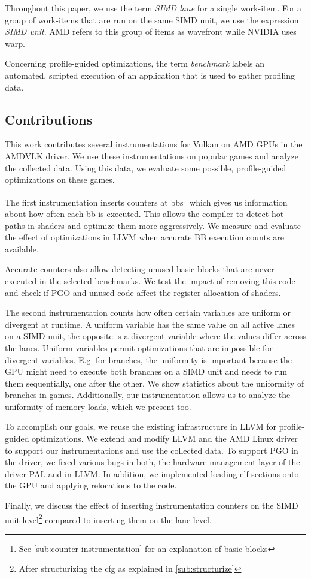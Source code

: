 Throughout this paper, we use the term \emph{SIMD lane} for a single work-item.
For a group of work-items that are run on the same SIMD unit, we use the expression \emph{SIMD unit}.
AMD refers to this group of items as wavefront while NVIDIA uses warp.

Concerning profile-guided optimizations, the term \emph{benchmark} labels an automated, scripted execution of an application that is used to gather profiling data.


\subsection{Contributions}
\label{sub:contributions}
This work contributes several instrumentations for Vulkan on AMD GPUs in the AMDVLK driver.
We use these instrumentations on popular games and analyze the collected data.
Using this data, we evaluate some possible, profile-guided optimizations on these games.

The first instrumentation inserts counters at \glspl{bb}\footnote{See \cref{sub:counter-instrumentation} for an explanation of basic blocks} which gives us information about how often each \gls{bb} is executed.
This allows the compiler to detect hot paths in shaders and optimize them more aggressively.
We measure and evaluate the effect of optimizations in LLVM when accurate BB execution counts are available.

Accurate counters also allow detecting unused basic blocks that are never executed in the selected benchmarks. We test the impact of removing this code and check if PGO and unused code affect the register allocation of shaders.

The second instrumentation counts how often certain variables are uniform or divergent at runtime. A uniform variable has the same value on all active lanes on a SIMD unit, the opposite is a divergent variable where the values differ across the lanes.
Uniform variables permit optimizations that are impossible for divergent variables.
E.g. for branches, the uniformity is important because the GPU might need to execute both branches on a SIMD unit and needs to run them sequentially, one after the other.
We show statistics about the uniformity of branches in games.
Additionally, our instrumentation allows us to analyze the uniformity of memory loads, which we present too.

To accomplish our goals, we reuse the existing infrastructure in LLVM for profile-guided optimizations.
We extend and modify LLVM and the AMD Linux driver to support our instrumentations and use the collected data.
To support PGO in the driver, we fixed various bugs in both, the hardware management layer of the driver PAL and in LLVM.
In addition, we implemented loading \gls{elf} sections onto the GPU and applying relocations to the code.

Finally, we discuss the effect of inserting instrumentation counters on the SIMD unit level\footnote{After structurizing the \gls{cfg} as explained in \cref{sub:structurize}} compared to inserting them on the lane level.
